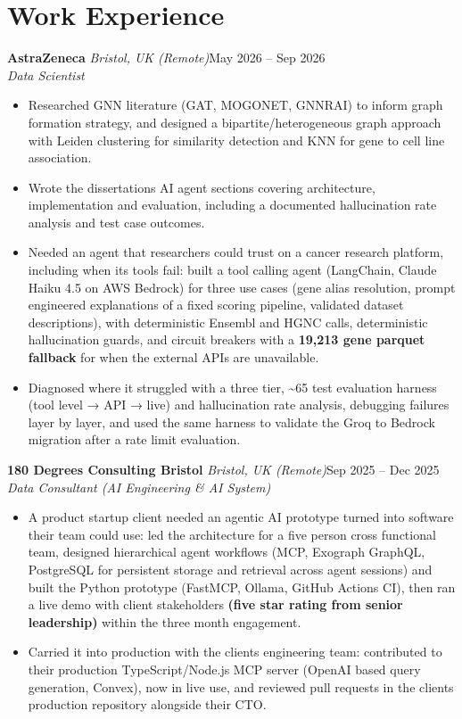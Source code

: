 \documentclass[a4paper,11pt]{article}
\newcommand{\role}[4]{%
  \textbf{#1}{\color{muted}\,\textperiodcentered\,\textit{#2}}\hfill{\color{muted}#3}\\
  \textit{#4}\par}
\newcommand{\gap}{\vspace{5pt}}
\newcommand{\num}[1]{\textbf{#1}}   %
\begin{document}
\section{Work Experience}
\role{AstraZeneca}{Bristol, UK (Remote)}{May 2026 – Sep 2026}{Data Scientist}
\begin{itemize}
  \item Researched GNN literature (GAT, MOGONET, GNNRAI) to inform graph formation strategy, and designed a bipartite/heterogeneous graph approach with Leiden clustering for similarity detection and KNN for gene to cell line association.
  \item Wrote the dissertation\textquotesingle{}s AI agent sections covering architecture, implementation and evaluation, including a documented hallucination rate analysis and test case outcomes.
  \item Needed an agent that researchers could trust on a cancer research platform, including when its tools fail: built a tool calling agent (LangChain, Claude Haiku 4.5 on AWS Bedrock) for three use cases (gene alias resolution, prompt engineered explanations of a fixed scoring pipeline, validated dataset descriptions), with deterministic Ensembl and HGNC calls, deterministic hallucination guards, and circuit breakers with a \num{19,213 gene parquet fallback} for when the external APIs are unavailable.
  \item Diagnosed where it struggled with a three tier, \textasciitilde{}65 test evaluation harness (tool level → API → live) and hallucination rate analysis, debugging failures layer by layer, and used the same harness to validate the Groq to Bedrock migration after a rate limit evaluation.
\end{itemize}
\gap
{}
\role{180 Degrees Consulting Bristol}{Bristol, UK (Remote)}{Sep 2025 – Dec 2025}{Data Consultant (AI Engineering \& AI System)}
\begin{itemize}
  \item A product startup client needed an agentic AI prototype turned into software their team could use: led the architecture for a five person cross functional team, designed hierarchical agent workflows (MCP, Exograph GraphQL, PostgreSQL for persistent storage and retrieval across agent sessions) and built the Python prototype (FastMCP, Ollama, GitHub Actions CI), then ran a live demo with client stakeholders \num{(five star rating from senior leadership)} within the three month engagement.
  \item Carried it into production with the client\textquotesingle{}s engineering team: contributed to their production TypeScript/Node.js MCP server (OpenAI based query generation, Convex), now in live use, and reviewed pull requests in the client\textquotesingle{}s production repository alongside their CTO.
\end{itemize}
\end{document}
